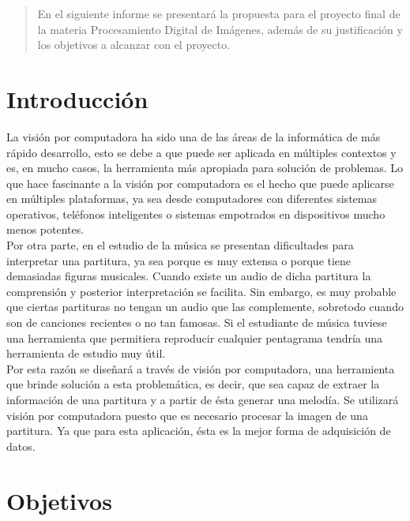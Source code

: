 \documentclass[letterpaper,12pt, twocolumn]{article}
\begin{document}
\maketitle %



\begin{abstract}
En el siguiente informe se presentará la propuesta para el 
proyecto final de la materia Procesamiento Digital de 
Imágenes, además de su justificación y los objetivos a 
alcanzar con el proyecto.  
\end{abstract}

\section{Introducción}
La visión por computadora ha sido una de las áreas 
de la informática de más rápido desarrollo, esto se 
debe a que puede ser aplicada en múltiples contextos 
y es, en mucho casos, la herramienta más apropiada 
para solución de problemas. Lo que hace fascinante a 
la visión por computadora es el hecho que puede 
aplicarse en múltiples plataformas, ya sea desde 
computadores con diferentes sistemas operativos, 
teléfonos inteligentes o sistemas empotrados en 
dispositivos mucho menos potentes. \\

Por otra parte, en el estudio de la música se 
presentan dificultades para interpretar una partitura, 
ya sea porque es muy extensa o porque tiene demasiadas
figuras musicales. Cuando existe un audio de dicha 
partitura la comprensión y posterior interpretación 
se facilita. Sin embargo, es muy probable que ciertas 
partituras no tengan un audio que las complemente, 
sobretodo cuando son de canciones recientes o no tan 
famosas. Si el estudiante de música tuviese una 
herramienta que permitiera reproducir cualquier 
pentagrama tendría una herramienta de estudio muy útil. \\

Por esta razón se diseñará a través de visión por 
computadora, una herramienta que brinde solución a 
esta problemática, es decir, que sea capaz de extraer 
la información de una partitura y a partir de ésta 
generar una melodía. Se utilizará visión por 
computadora puesto que es necesario procesar la imagen 
de una partitura. Ya que para esta aplicación, ésta es 
la mejor forma de adquisición de datos. 

\section{Objetivos}
\end{document}
